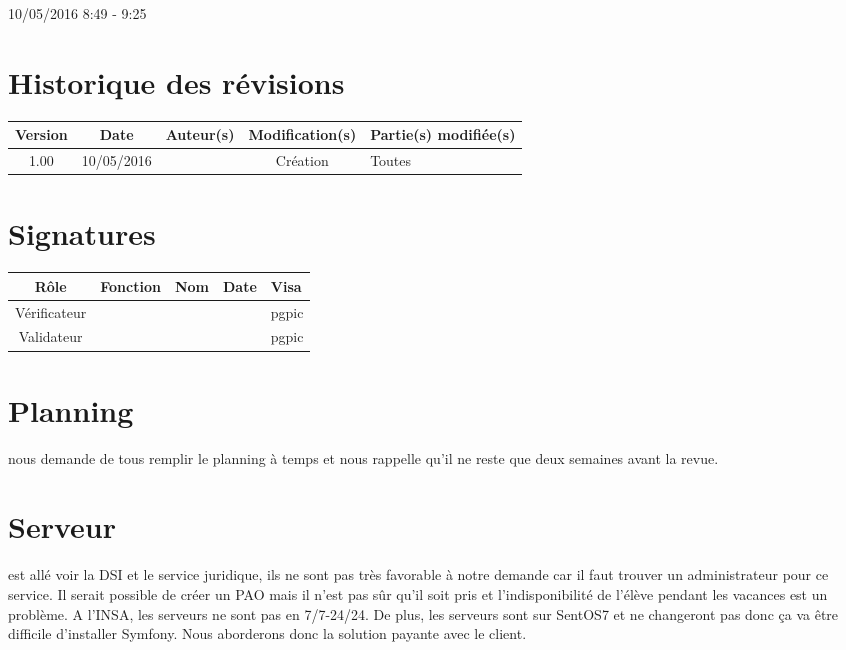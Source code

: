 \documentclass [a4paper] {article}
\begin{document}
10/05/2016			 				%
\hfill   
\hfill 	 8:49 - 9:25				%



\section*{Historique des révisions}
\begin{center}
			\begin{tabular}{| c | c | c | c | p{4cm} |}
				\hline
				\rowcolor{Gray}
				Version & Date & Auteur(s) & Modification(s) & Partie(s) modifiée(s)		 \\
				\hline
				1.00 & 10/05/2016 & \Pierre & Création & Toutes \\
		\hline		
			\end{tabular}
		\end{center}

\section*{Signatures}

		\begin{center}
			\begin{tabular}{| c | c | c | c | p{4cm} |}
				\hline
				\rowcolor{Gray}
				Rôle & Fonction & Nom & Date & Visa		 \\
				\hline
				Vérificateur & \RQA & \Kafui &  & pgpic \\[30pt]
				\hline
				Validateur & \CP & \Sergi &  & pgpic \\[30pt]	
				\hline
			\end{tabular}
		\end{center}


\section{Planning}
\Sergi{} nous demande de tous remplir le planning à temps et nous rappelle qu'il ne reste que deux semaines avant la revue.

\section{Serveur}
\Sergi{} est allé voir la DSI et le service juridique, ils ne sont pas très favorable à notre demande car il faut trouver un administrateur pour ce service. Il serait possible de créer un PAO mais il n'est pas sûr qu'il soit pris et l'indisponibilité de l'élève pendant les vacances est un problème. A l'INSA, les serveurs ne sont pas en 7/7-24/24. De plus, les serveurs sont sur SentOS7 et ne changeront pas donc ça va être difficile d'installer Symfony. Nous aborderons donc la solution payante avec le client.
\end{document}

